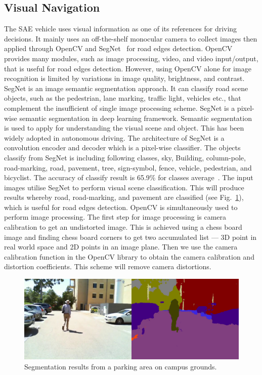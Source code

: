 \subsection{Visual Navigation}
The SAE vehicle uses visual information as one of its references for driving decisions. It mainly uses an off-the-shelf monocular camera to collect images then applied through OpenCV and SegNet~\cite{badrinarayanan_segnet:_2017} for road edges detection. OpenCV provides many modules, such as image processing, video, and video input/output, that is useful for road edges detection. However, using OpenCV alone for image recognition is limited by variations in image quality, brightness, and contrast. SegNet is an image semantic segmentation approach. It can classify road scene objects, such as the pedestrian, lane marking, traffic light, vehicles etc., that complement the insufficient of single image processing scheme. SegNet is a pixel-wise semantic segmentation in deep learning framework. Semantic segmentation is used to apply for understanding the visual scene and object. This has been widely adopted in autonomous driving. The architecture of SegNet is a convolution encoder and decoder which is a pixel-wise classifier. The objects classify from SegNet is including following classes, sky, Building, column-pole, road-marking, road, pavement, tree, sign-symbol, fence, vehicle, pedestrian, and bicyclist. The accuracy of classify result is 65.9\% for classes average~\cite{badrinarayanan_segnet:_2017}. The input images utilise SegNet to perform visual scene classification. This will produce results whereby road, road-marking, and pavement are classified (see Fig.~\ref{fig:6:carpark}), which is useful for road edges detection. OpenCV is simultaneously used to perform image processing. The first step for image processing is camera calibration to get an undistorted image. This is achieved using a chess board image and finding chess board corners to get two accumulated list --- 3D point in real world space and 2D points in an image plane. Then we use the camera calibration function in the OpenCV library to obtain the camera calibration and distortion coefficients. This scheme will remove camera distortions.

\begin{figure}[H]
	\centering
	\includegraphics[width=0.8\linewidth]{2}
	\caption{Segmentation results from a parking area on campus grounds.}
	\label{fig:6:carpark}
\end{figure}

